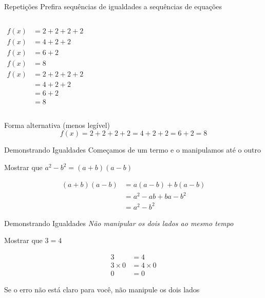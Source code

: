 \documentclass[fleqn,utf8,aspectratio=169,12pt,ignorenonframetext]{beamer}
\begin{document}
\begin{frame}{Repetições}
Prefira sequências de igualdades a sequências de equações
\begin{columns}
  \pause
  \begin{align*}
    f(x) & = 2 + 2 + 2 + 2 \\
    f(x) & = 4 + 2 + 2     \\
    f(x) & = 6 + 2         \\
    f(x) & = 8
  \end{align*}
  \pause
  \begin{align*}
    f(x) & = 2 + 2 + 2 + 2 \\
         & = 4 + 2 + 2     \\
         & = 6 + 2         \\
         & = 8
  \end{align*}
\end{columns}

\pause
\vspace{\baselineskip}
Forma alternativa (menos legível)
\[
  f(x)
  = 2 + 2 + 2 + 2
  = 4 + 2 + 2
  = 6 + 2
  = 8
\]
\end{frame}

\begin{frame}{Demonstrando Igualdades}
  Começamos de um termo e o manipulamos até o outro

  \pause
  \vspace{\baselineskip}
  Mostrar que \(a^2-b^2 = (a+b)(a-b)\)

  \pause
  \begin{align*}
    (a+b)(a-b)
    & = a(a-b) + b(a-b) \\
    & = a^2 - ab + ba - b^2 \\
    & = a^2 - b^2
  \end{align*}
\end{frame}

\begin{frame}{Demonstrando Igualdades}
  \emph{Não manipular os dois lados ao mesmo tempo}

  \pause
  \vspace{\baselineskip}
  Mostrar que \(3=4\)

  \pause
  \begin{align*}
    3          & = 4          \\
    3 \times 0 & = 4 \times 0 \\
    0          & = 0
  \end{align*}

  \pause
  Se o erro não está claro para você, não manipule os dois lados
\end{frame}
\end{document}
